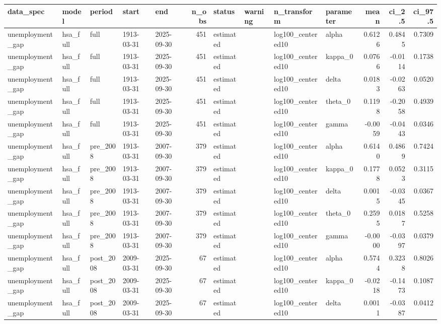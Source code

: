 \begin{tabular}{lllllrllllrrr}
\toprule
data\_spec & model & period & start & end & n\_obs & status & warning & n\_transform & parameter & mean & ci\_2.5 & ci\_97.5 \\
\midrule
unemployment\_gap & hsa\_full & full & 1913-03-31 & 2025-09-30 & 451 & estimated &  & log100\_centered10 & alpha & 0.6126 & 0.4845 & 0.7309 \\
unemployment\_gap & hsa\_full & full & 1913-03-31 & 2025-09-30 & 451 & estimated &  & log100\_centered10 & kappa\_0 & 0.0766 & -0.0114 & 0.1738 \\
unemployment\_gap & hsa\_full & full & 1913-03-31 & 2025-09-30 & 451 & estimated &  & log100\_centered10 & delta & 0.0183 & -0.0263 & 0.0520 \\
unemployment\_gap & hsa\_full & full & 1913-03-31 & 2025-09-30 & 451 & estimated &  & log100\_centered10 & theta\_0 & 0.1198 & -0.2058 & 0.4939 \\
unemployment\_gap & hsa\_full & full & 1913-03-31 & 2025-09-30 & 451 & estimated &  & log100\_centered10 & gamma & -0.0059 & -0.0443 & 0.0346 \\
unemployment\_gap & hsa\_full & pre\_2008 & 1913-03-31 & 2007-09-30 & 379 & estimated &  & log100\_centered10 & alpha & 0.6140 & 0.4869 & 0.7424 \\
unemployment\_gap & hsa\_full & pre\_2008 & 1913-03-31 & 2007-09-30 & 379 & estimated &  & log100\_centered10 & kappa\_0 & 0.1778 & 0.0523 & 0.3115 \\
unemployment\_gap & hsa\_full & pre\_2008 & 1913-03-31 & 2007-09-30 & 379 & estimated &  & log100\_centered10 & delta & 0.0015 & -0.0345 & 0.0367 \\
unemployment\_gap & hsa\_full & pre\_2008 & 1913-03-31 & 2007-09-30 & 379 & estimated &  & log100\_centered10 & theta\_0 & 0.2595 & 0.0187 & 0.5258 \\
unemployment\_gap & hsa\_full & pre\_2008 & 1913-03-31 & 2007-09-30 & 379 & estimated &  & log100\_centered10 & gamma & -0.0000 & -0.0397 & 0.0379 \\
unemployment\_gap & hsa\_full & post\_2008 & 2009-03-31 & 2025-09-30 & 67 & estimated &  & log100\_centered10 & alpha & 0.5744 & 0.3238 & 0.8026 \\
unemployment\_gap & hsa\_full & post\_2008 & 2009-03-31 & 2025-09-30 & 67 & estimated &  & log100\_centered10 & kappa\_0 & -0.0218 & -0.1473 & 0.1087 \\
unemployment\_gap & hsa\_full & post\_2008 & 2009-03-31 & 2025-09-30 & 67 & estimated &  & log100\_centered10 & delta & 0.0011 & -0.0387 & 0.0412 \\

\end{tabular}
